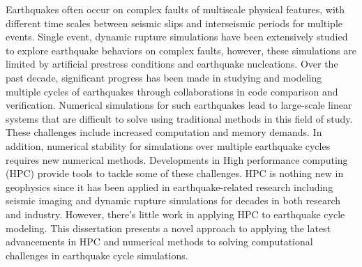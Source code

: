 Earthquakes often occur on complex faults of multiscale physical features, with different time scales between seismic slips and interseismic periods for multiple events.
Single event, dynamic rupture simulations have been extensively studied to explore earthquake behaviors on complex faults, however, these simulations are limited by artificial prestress conditions and earthquake nucleations.
Over the past decade, significant progress has been made in studying and modeling multiple cycles of earthquakes through collaborations in code comparison and verification.
Numerical simulations for such earthquakes lead to large-scale linear systems that are difficult to solve using traditional methods in this field of study.
These challenges include increased computation and memory demands.
In addition, numerical stability for simulations over multiple earthquake cycles requires new numerical methods.
Developments in High performance computing (HPC) provide tools to tackle some of these challenges.
HPC is nothing new in geophysics since it has been applied in earthquake-related research including seismic imaging and dynamic rupture simulations for decades in both research and industry.
However, there's little work in applying HPC to earthquake cycle modeling. 
This dissertation presents a novel approach to applying the latest advancements in HPC and numerical methods to solving computational challenges in earthquake cycle simulations.